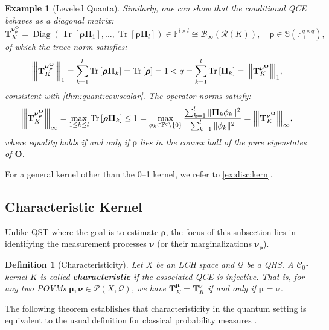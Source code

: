 \documentclass[noinfoline]{imsart}\setcounter{tocdepth}{2}
\renewcommand{\b}[1]{\mathbb{#1}} %
\newcommand{\m}[1]{\mathbf{#1}} %
\newcommand{\s}[1]{\mathscr{#1}} %
\renewcommand{\c}[1]{\mathcal{#1}} %
\newcommand{\mb}[1]{\boldsymbol{#1}} %
\newcommand{\tr}[1]{\operatorname{Tr}\left[#1\right]}
\newcommand{\vertiii}[1]{{\left\vert\kern-0.25ex\left\vert\kern-0.25ex\left\vert #1 
    \right\vert\kern-0.25ex\right\vert\kern-0.25ex\right\vert}} %
\newcommand{\Diag}{\operatorname{Diag}}
\theoremstyle{plain}
\newtheorem{definition}[theorem]{Definition}
\newtheorem{example}[theorem]{Example}
\begin{document}
\begin{example}[Leveled Quanta]
Similarly, one can show that the conditional QCE behaves as a diagonal matrix:
\begin{equation*}
    \m{T}_{K}^{\mb{\nu}^{\m{O}}_{\mb{\rho}}} = \Diag(\tr{\mb{\rho} \m{\Pi}_{1}}, \dots, \tr{\mb{\rho} \m{\Pi}_{l}}) \in \b{F}^{l \times l} \cong \c{B}_{\infty}(\c{R}(K)), \quad \mb{\rho} \in \b{S}(\b{F}_{+}^{q \times q}),
\end{equation*}
of which the trace norm satisfies:
\begin{equation*}
    \vertiii{\m{T}_{K}^{\mb{\nu}^{\m{O}}_{\mb{\rho}}}}_{1} = \sum_{k=1}^l \tr{\mb{\rho} \m{\Pi}_{k}} = \tr{\mb{\rho}} = 1 < q = \sum_{k=1}^l \tr{ \m{\Pi}_{k}} = \vertiii{ \m{T}_{K}^{\mb{\nu}^{\m{O}}} }_{1},
\end{equation*}
consistent with \cref{thm:quant:cov:scalar}. The operator norms satisfy:
\begin{equation*}
    \vertiii{\m{T}_{K}^{\mb{\nu}^{\m{O}}_{\mb{\rho}}}}_{\infty} = \max_{1 \le k \le l} \tr{\mb{\rho} \m{\Pi}_{k}} \le 1 = \max_{\phi_{k} \in \b{F}^{q} \backslash \{0\}} \frac{\sum_{k=1}^{l} \| \m{\Pi}_{k} \phi_{k} \|^{2}}{\sum_{k=1}^{l} \| \phi_{k} \|^{2}}  = \vertiii{\m{T}_{K}^{\mb{\nu}^{\m{O}}}}_{\infty},
\end{equation*}
where equality holds if and only if $\mb{\rho}$ lies in the convex hull of the pure eigenstates of $\m{O}$.
\end{example}
For a general kernel other than the 0--1 kernel, we refer to \cref{ex:disc:kern}.


\subsection{Characteristic Kernel}
Unlike QST where the goal is to estimate $\mb{\rho}$, the focus of this subsection lies in identifying the measurement processes $\mb{\nu}$ (or their marginalizations $\mb{\nu}_{\mb{\rho}}$).

\begin{definition}[Characteristicity]
Let $X$ be an LCH space and $\c{Q}$ be a QHS. A $\c{C}_{0}$-kernel $K$ is called \textbf{characteristic} if the associated QCE is injective. That is, for any two POVMs $\mb{\mu}, \mb{\nu} \in \s{P}(X, \c{Q})$, we have $\m{T}_{K}^{\mb{\mu}} = \m{T}_{K}^{\mb{\nu}}$ if and only if $\mb{\mu} = \mb{\nu}$.
\end{definition}

The following theorem establishes that characteristicity in the quantum setting is equivalent to the usual definition for classical probability measures \cite{fukumizu2004dimensionality, sriperumbudur2010hilbert}.
\end{document}
